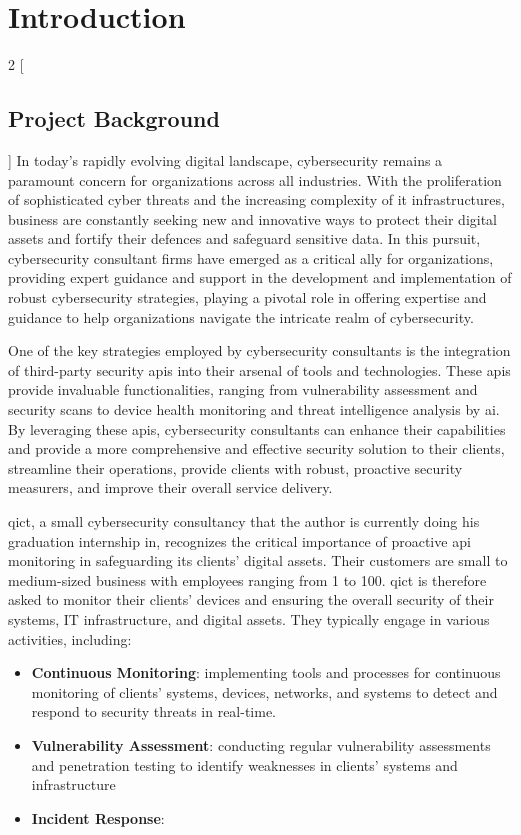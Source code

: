 \chapter{Introduction}
\begin{multicols}{2}
    [\section{Project Background}]
    In today's rapidly evolving digital landscape, cybersecurity remains a paramount concern for organizations
    across all industries. With the proliferation of sophisticated cyber threats and the increasing complexity of
    \acrshort{it} infrastructures, business are constantly seeking new and innovative ways to protect their digital
    assets and fortify their defences and safeguard sensitive data. In this pursuit, cybersecurity consultant firms
    have emerged as a critical ally for organizations, providing expert guidance and support in the development and
    implementation of robust cybersecurity strategies, playing a pivotal role in offering expertise and guidance to
    help organizations navigate the intricate realm of cybersecurity.

    One of the key strategies employed by cybersecurity consultants is the integration of third-party security
    \acrshort{api}s into their arsenal of tools and technologies. These \acrshort{api}s provide invaluable
    functionalities, ranging from vulnerability assessment and security scans to device health monitoring and
    threat intelligence analysis by \acrshort{ai}. By leveraging these \acrshort{api}s, cybersecurity consultants
    can enhance their capabilities and provide a more comprehensive and effective security solution to their
    clients, streamline their operations, provide clients with robust, proactive security measurers, and improve
    their overall service delivery.

    \acrshort{qict}, a small cybersecurity consultancy that the author is currently doing his graduation
    internship in,
    recognizes the critical importance of proactive \acrshort{api} monitoring in safeguarding its clients' digital
    assets. Their customers are small to medium-sized business with employees ranging from 1 to 100. \acrshort{qict} is
    therefore asked to monitor their clients' devices and ensuring the overall security of their systems, IT
    infrastructure, and digital assets. They typically engage in various activities, including:
    \begin{itemize}
        \item \textbf{Continuous Monitoring}: implementing tools and processes for continuous monitoring of
              clients' systems, devices, networks, and systems to detect and respond to security threats in
              real-time.
        \item \textbf{Vulnerability Assessment}: conducting regular vulnerability assessments and penetration
              testing to identify weaknesses in clients' systems and infrastructure
        \item \textbf{Incident Response}:
    \end{itemize}


\end{multicols}
